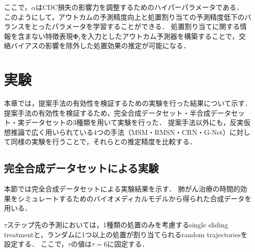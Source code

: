 \documentclass[dvipdfmx]{jreport}
\begin{document}
ここで，$\alpha$はCDC損失の影響力を調整するためのハイパーパラメータである．
このようにして，アウトカムの予測精度向上と処置割り当ての予測精度低下のバランスをとったパラメータを学習することができる．
処置割り当てに関する情報を含まない特徴表現$\boldsymbol{\Phi}_t$を入力としたアウトカム予測器を構築することで，交絡バイアスの影響を除外した処置効果の推定が可能になる．

\section{実験}\label{実験}
本章では，提案手法の有効性を検証するための実験を行った結果について示す．
提案手法の有効性を検証するため，完全合成データセット・半合成データセット・実データセットの3種類を用いて実験を行った．
提案手法以外にも，反実仮想推論で広く用いられている4つの手法（MSM・RMSN・CRN・G-Net）に対して同様の実験を行うことで，それらとの推定精度を比較する．

\subsection{完全合成データセットによる実験}
本節では完全合成データセットによる実験結果を示す．
肺がん治療の時間的効果をシミュレートするためのバイオメディカルモデルから得られた合成データを用いる．


$\tau$ステップ先の予測においては，1種類の処置のみを考慮するsingle sliding treatmentと，ランダムに1つ以上の処置が割り当てられるrandom trajectoriesを設定する．
ここで，$\tau$の値は$\tau=6$に固定する．
\end{document}
